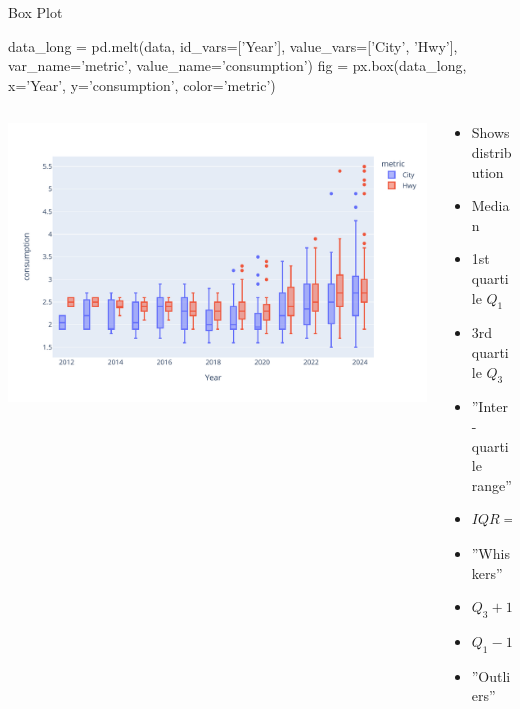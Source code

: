 \documentclass[ignorenonframetext,xcolor=x11names]{beamer}
\begin{document}
\begin{frame}[fragile]{Box Plot}
\begin{pythoncode}
data_long = pd.melt(data, 
    id_vars=['Year'], value_vars=['City', 'Hwy'], 
    var_name='metric', value_name='consumption')
fig = px.box(data_long, 
             x='Year', y='consumption', color='metric')
\end{pythoncode}
\begin{columns}
\begin{column}{.75\textwidth}
  \includegraphics[width=\textwidth]{px.fuel.box.pdf}
\end{column}
\begin{column}{.35\textwidth}
\footnotesize
\begin{itemize}
   \item Shows distribution
   \item Median
   \item 1st quartile $Q_1$
   \item 3rd quartile $Q_3$
   \item ''Inter-quartile range''
   \item $IQR = Q_3 - Q_1$
   \item ''Whiskers''
   \item $Q_3 + 1.5 \times IQR$
   \item $Q_1 - 1.5 \times IQR$
   \item ''Outliers''
\end{itemize}
\end{column}
\end{columns}
\end{frame}
\end{document}
